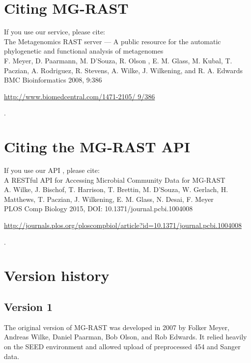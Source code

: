 \documentclass[12pt,fullpage]{report}
\begin{document}
\section{Citing MG-RAST}
\label{section:MG-RAST-citation}
If you use our service, please cite: \\
\noindent
The Metagenomics RAST server --- A public resource for the automatic phylogenetic and functional analysis of metagenomes \\
\noindent
F. Meyer, D. Paarmann, M. D'Souza, R. Olson , E. M. Glass, M. Kubal, T. Paczian, A. Rodriguez, R. Stevens, A. Wilke, J. Wilkening, and R. A. Edwards \\
\noindent
BMC Bioinformatics 2008, 9:386 \\
\noindent
\begin{small}\url{http://www.biomedcentral.com/1471-2105/ 9/386}\end{small}.

\section{Citing the MG-RAST API}
If you use our API , please cite: \\
\noindent
A RESTful API for Accessing Microbial Community Data for MG-RAST\\
\noindent
  A. Wilke,   J. Bischof,  T. Harrison,  T. Brettin,   M. D'Souza,  W. Gerlach,     H. Matthews,  T. Paczian,   J. Wilkening,     E. M. Glass,    N. Desai,
    F. Meyer \\
\noindent
PLOS Comp Biology 2015, DOI: 10.1371/journal.pcbi.1004008\\
\noindent
\begin{small}\url{http://journals.plos.org/ploscompbiol/article?id=10.1371/journal.pcbi.1004008}\end{small}.


\section{Version history}
\subsection*{Version 1}
The original version of MG-RAST was developed in 2007 by Folker Meyer, Andreas Wilke, Daniel Paarman, Bob Olson, and Rob Edwards. It relied heavily on the \gls{SEED}\cite{SUBSYSTEMS} environment and allowed upload of preprocessed 454 and Sanger data.
\end{document}
